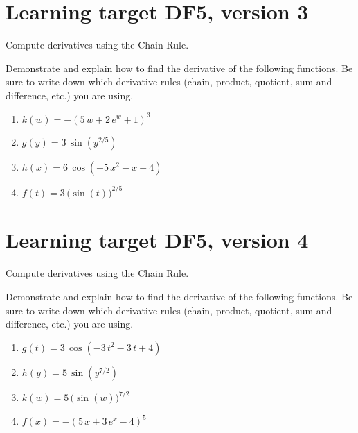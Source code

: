 \pagebreak

\section{Learning target DF5, version 3}

Compute derivatives using the Chain Rule.

\hrulefill

Demonstrate and explain how to find the derivative of the following functions. Be sure to write down which derivative rules (chain, product, quotient, sum and difference, etc.) you are using.

\begin{enumerate}
    \item \(k(w)= -{\left(5 \, w + 2 \, e^{w} + 1\right)}^{3}\)
    \vfill
    \item \(g(y)= 3 \, \sin\left(y^{2/5}\right)\)
    \vfill
    \item \(h(x)= 6 \, \cos\left(-5 \, x^{2} - x + 4\right)\)
    \vfill
    \item \(f(t)= 3 \, \Big(\sin\left(t\right)\Big)^{2/5}\)
    \vfill
\end{enumerate}

\pagebreak

\section{Learning target DF5, version 4}

Compute derivatives using the Chain Rule.

\hrulefill

Demonstrate and explain how to find the derivative of the following functions. Be sure to write down which derivative rules (chain, product, quotient, sum and difference, etc.) you are using.

\begin{enumerate}
    \item \(g(t)= 3 \, \cos\left(-3 \, t^{2} - 3 \, t + 4\right)\)
    \vfill
    \item \(h(y)= 5 \, \sin\left(y^{7/2}\right)\)
    \vfill
    \item \(k(w)= 5 \, \Big(\sin\left(w\right)\Big)^{7/2}\)
    \vfill
    \item \(f(x)= -{\left(5 \, x + 3 \, e^{x} - 4\right)}^{5}\)
    \vfill
\end{enumerate}

\pagebreak

